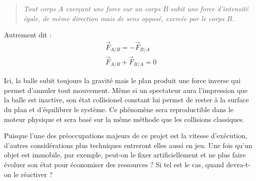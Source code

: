 \begin{quote}
\textit{Tout corps $A$ exerçant une force sur un corps $B$ subit une force
d'intensité égale, de même direction mais de sens opposé, exercée par
le corps $B$.}
\end{quote}

Autrement dit :
\begin{align*}
  &\vec{F}_{A/B} = -\vec{F}_{B/A} \\
  &\vec{F}_{A/B} + \vec{F}_{B/A} = 0
\end{align*}

Ici, la balle subit toujours la gravité mais le plan produit une force
inverse qui permet d'annuler tout mouvement. Même si un spectateur
aura l'impression que la balle est inactive, son état collisionel
constant lui permet de rester à la surface du plan et d'équilibrer le
système. Ce phénomène sera reproductible dans le moteur physique et
sera basé sur la même méthode que les collisions classiques.

Puisque l'une des préoccupations majeurs de ce projet est la vitesse
d'exécution, d'autres considérations plus techniques entreront elles
aussi en jeu. Une fois qu'un objet est immobile, par exemple, peut-on
le fixer artificiellement et ne plus faire évoluer son état pour
économiser des ressources ? Si tel est le cas, quand devra-t-on le
réactiver ?

